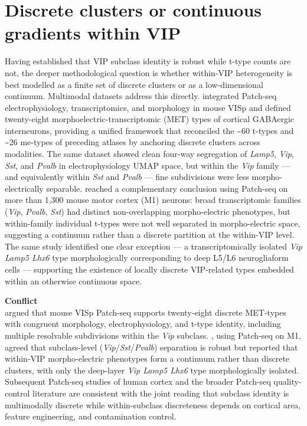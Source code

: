 \documentclass[11pt]{article}
\begin{document}
\section{Discrete clusters or continuous gradients within VIP}

Having established that VIP subclass identity is robust while t-type counts are not, the deeper methodological question is whether within-VIP heterogeneity is best modelled as a finite set of discrete clusters or as a low-dimensional continuum. Multimodal datasets address this directly. \citet{Gouwens2020a} integrated Patch-seq electrophysiology, transcriptomics, and morphology in mouse VISp and defined twenty-eight morphoelectric-transcriptomic (MET) types of cortical GABAergic interneurons, providing a unified framework that reconciled the {\textasciitilde}60 t-types and {\textasciitilde}26 me-types of preceding atlases by anchoring discrete clusters across modalities. The same dataset showed clean four-way segregation of \textit{Lamp5}, \textit{Vip}, \textit{Sst}, and \textit{Pvalb} in electrophysiology UMAP space, but within the \textit{Vip} family --- and equivalently within \textit{Sst} and \textit{Pvalb} --- fine subdivisions were less morpho-electrically separable. \citet{Scala2021} reached a complementary conclusion using Patch-seq on more than 1,300 mouse motor cortex (M1) neurons: broad transcriptomic families (\textit{Vip}, \textit{Pvalb}, \textit{Sst}) had distinct non-overlapping morpho-electric phenotypes, but within-family individual t-types were not well separated in morpho-electric space, suggesting a continuum rather than a discrete partition at the within-VIP level. The same study identified one clear exception --- a transcriptomically isolated \textit{Vip Lamp5 Lhx6} type morphologically corresponding to deep L5/L6 neurogliaform cells --- supporting the existence of locally discrete VIP-related types embedded within an otherwise continuous space.

\begin{framed}
\textbf{Conflict}\\
\citet{Gouwens2020a} argued that mouse VISp Patch-seq supports twenty-eight discrete MET-types with congruent morphology, electrophysiology, and t-type identity, including multiple resolvable subdivisions within the \textit{Vip} subclass. \citet{Scala2021}, using Patch-seq on M1, agreed that subclass-level (\textit{Vip}/\textit{Sst}/\textit{Pvalb}) separation is robust but reported that within-VIP morpho-electric phenotypes form a continuum rather than discrete clusters, with only the deep-layer \textit{Vip Lamp5 Lhx6} type morphologically isolated. Subsequent Patch-seq studies of human cortex \citep{Lee2023a, Kalmbach2021} and the broader Patch-seq quality-control literature \citep{Tripathy2018} are consistent with the joint reading that subclass identity is multimodally discrete while within-subclass discreteness depends on cortical area, feature engineering, and contamination control.
\end{framed}
\end{document}

